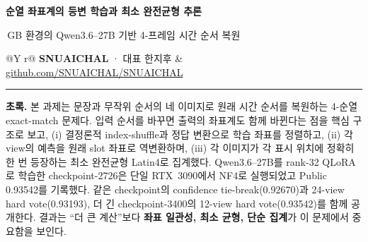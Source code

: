 \documentclass[9pt,a4paper]{extarticle}
\begin{document}
\thispagestyle{empty}

{\sffamily\bfseries\fontsize{17}{19}\selectfont
순열 좌표계의 등변 학습과 최소 완전균형 추론\par}
\vspace{2pt}
{\sffamily\fontsize{11}{13}\,GB 환경의 Qwen3.6--27B 기반 4-프레임 시간 순서 복원\par}
\vspace{5pt}
\begin{tabularx}{\textwidth}{@{}Y r@{}}
\textbf{SNUAICHAL} · 대표 한지후 &
\href{https://github.com/SNUAICHAL/SNUAICHAL}{github.com/SNUAICHAL/SNUAICHAL}\\
\end{tabularx}
\vspace{2pt}\hrule\vspace{5pt}

\textbf{초록.}
본 과제는 문장과 무작위 순서의 네 이미지로 원래 시간 순서를 복원하는
4-순열 exact-match 문제다. 입력 순서를 바꾸면 출력의 좌표계도 함께 바뀐다는 점을
핵심 구조로 보고, (i) 결정론적 index-shuffle과 정답 변환으로 학습 좌표를
정렬하고, (ii) 각 view의 예측을 원래 slot 좌표로 역변환하며, (iii) 각 이미지가
각 표시 위치에 정확히 한 번 등장하는 최소 완전균형 Latin4로 집계했다.
Qwen3.6--27B를 rank-32 QLoRA로 학습한 checkpoint-2726은 단일 RTX~3090에서
NF4로 실행되었고 Public 0.93542를 기록했다. 같은 checkpoint의 confidence
tie-break(0.92670)과 24-view hard vote(0.93193), 더 긴 checkpoint-3400의
12-view hard vote(0.93542)를 함께 공개한다. 결과는 ``더 큰 계산''보다
\textbf{좌표 일관성, 최소 균형, 단순 집계}가 이 문제에서 중요함을 보인다.
\end{document}
